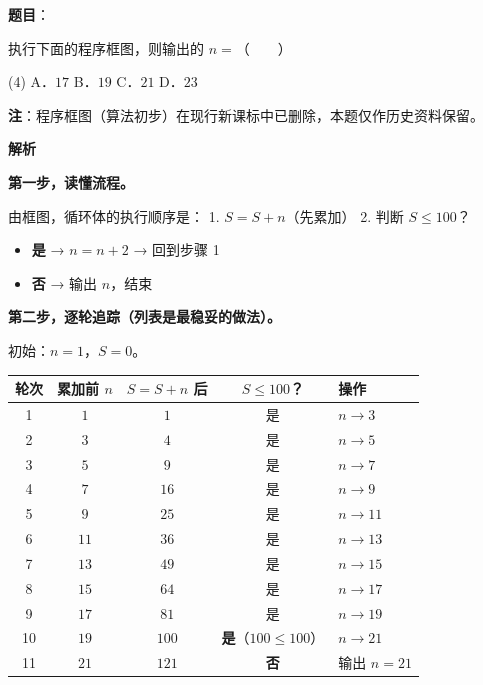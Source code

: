 \begin{answer}

\textbf{题目}：

执行下面的程序框图，则输出的 $n=$\mbox{（　　）}
\nopagebreak[4]
\begin{center}\end{center}
\nopagebreak[4]
\begin{gkopts}(4)
\task A．$17$
\task B．$19$
\task C．$21$
\task D．$23$
\end{gkopts}

\begin{gktip}
\textbf{注}：程序框图（算法初步）在现行新课标中已删除，本题仅作历史资料保留。
\end{gktip}

\textbf{解析}

\textbf{第一步，读懂流程。}

由框图，循环体的执行顺序是：
1. $S=S+n$（先累加）
2. 判断 $S\le100$？
\begin{itemize}
\item \textbf{是} → $n=n+2$ → 回到步骤 1
\item \textbf{否} → 输出 $n$，结束
\end{itemize}

\textbf{第二步，逐轮追踪（列表是最稳妥的做法）。}

初始：$n=1$，$S=0$。

\begin{center}
\begin{tabular}{ccccl}
\toprule
轮次 & 累加前 $n$ & $S=S+n$ 后 & $S\le100$？ & 操作 \\
\midrule
1 & $1$ & $1$ & 是 & $n\to3$ \\
2 & $3$ & $4$ & 是 & $n\to5$ \\
3 & $5$ & $9$ & 是 & $n\to7$ \\
4 & $7$ & $16$ & 是 & $n\to9$ \\
5 & $9$ & $25$ & 是 & $n\to11$ \\
6 & $11$ & $36$ & 是 & $n\to13$ \\
7 & $13$ & $49$ & 是 & $n\to15$ \\
8 & $15$ & $64$ & 是 & $n\to17$ \\
9 & $17$ & $81$ & 是 & $n\to19$ \\
10 & $19$ & $100$ & \textbf{是}（$100\le100$） & $n\to21$ \\
11 & $21$ & $121$ & \textbf{否} & 输出 $n=21$ \\
\bottomrule
\end{tabular}
\end{center}


\end{answer}
